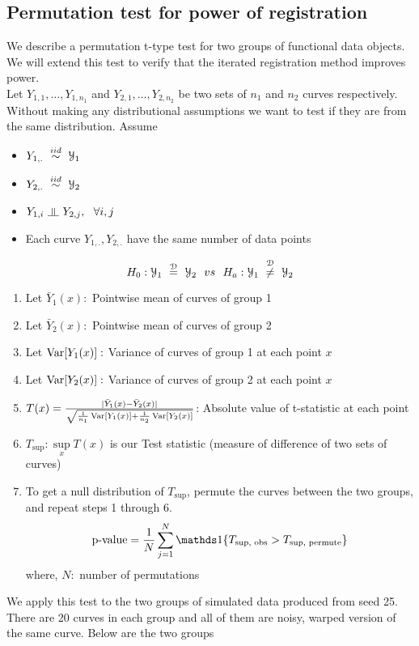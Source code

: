 \subsection{Permutation test for power of registration}
We describe a permutation t-type test for two groups of functional data objects. We will extend this test to verify that the iterated registration method improves power. \\
Let $Y_{1,1}, \dots, Y_{1,n_1}$ and $Y_{2,1}, \dots, Y_{2,n_2}$ be two sets of $n_1$ and $n_2$ curves respectively. Without making any distributional assumptions we want to test if they are from the same distribution.
Assume 
\begin{itemize}
\item $Y_{1,.}\  \stackrel{iid}{\sim} \ \Y_1$
\item $Y_{2,.}\  \stackrel{iid}{\sim} \ \Y_2$
\item $Y_{1,i}\  \indep \ Y_{2,j}, \ \ \forall i, j$
\item Each curve $Y_{1,.}, Y_{2,.}$ have the same number of data points
\end{itemize}
\[ H_0: \Y_1 \ \stackrel{\mathcal{D}}{=} \ \Y_2 \ \ vs \ \ H_a: \Y_1 \ \stackrel{\mathcal{D}}{\ne} \ \Y_2 \]
\begin{enumerate}
\item Let $\bar{Y}_1(x): $ Pointwise mean of curves of group 1
\item Let $\bar{Y}_2(x): $ Pointwise mean of curves of group 2
\item Let $\operatorname{Var}[Y_1(x)]: $ Variance of curves of group 1 at each point $x$ 
\item Let $\operatorname{Var}[Y_2(x)]: $ Variance of curves of group 2 at each point $x$ 
\item $T(x) = \frac{|\bar{Y}_1(x) - \bar{Y}_2(x)|}{\sqrt{\frac{1}{n_1}\operatorname{Var}[Y_1(x)] + 
\frac{1}{n_2}\operatorname{Var}[Y_2(x)]}}$: Absolute value of t-statistic at each point
\item $T_{\text{sup}}:  \sup\limits_{x} T(x)$ is our Test statistic (measure of difference of two sets of curves)
\item To get a null distribution of $T_{\text{sup}}$, permute the curves between the two groups, and repeat steps 1 through 6. \\
\[  \text{p-value} = \frac{1}{N}\sum\limits_{j = 1}^{N}\Ind\{T_{\text{sup, obs}} > T_{\text{sup, permute}} \} \]
where, $N:$ number of permutations
\end{enumerate}
We apply this test to the two groups of simulated data produced from seed 25. There are 20 curves in each group and all of them are noisy, warped version of the same curve. Below are the two groups
